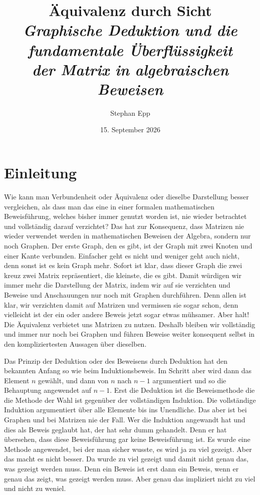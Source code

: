 \documentclass[12pt, a4paper]{article}
\title{\textbf{Äquivalenz durch Sicht}\\[0.5em]
  {\Large\itshape Graphische Deduktion und die fundamentale Überflüssigkeit\\ der Matrix in algebraischen Beweisen}}
\author{Stephan Epp}
\date{15. September 2026}
\theoremstyle{definition}
\theoremstyle{remark}
\begin{document}

\maketitle
\tableofcontents
\newpage

\section{Einleitung}
\label{sec:einleitung}

Wie kann man Verbundenheit oder Äquivalenz oder dieselbe Darstellung besser vergleichen, als dass man das eine in einer formalen mathematischen Beweisführung, welches bisher immer genutzt worden ist, nie wieder betrachtet und vollständig darauf verzichtet? Das hat zur Konsequenz, dass Matrizen nie wieder verwendet werden in mathematischen Beweisen der Algebra, sondern nur noch Graphen. Der erste Graph, den es gibt, ist der Graph mit zwei Knoten und einer Kante verbunden. Einfacher geht es nicht und weniger geht auch nicht, denn sonst ist es kein Graph mehr. Sofort ist klar, dass dieser Graph die zwei kreuz zwei Matrix repräsentiert, die kleinste, die es gibt. Damit würdigen wir immer mehr die Darstellung der Matrix, indem wir auf sie verzichten und Beweise und Anschauungen nur noch mit Graphen durchführen. Denn allen ist klar, wir verzichten damit auf Matrizen und vermissen sie sogar schon, denn vielleicht ist der ein oder andere Beweis jetzt sogar etwas mühsamer. Aber halt! Die Äquivalenz verbietet uns Matrizen zu nutzen. Deshalb bleiben wir vollständig und immer nur noch bei Graphen und führen Beweise weiter konsequent selbst in den kompliziertesten Aussagen über dieselben.

Das Prinzip der Deduktion oder des Beweisens durch Deduktion hat den bekannten Anfang so wie beim Induktionsbeweis. Im Schritt aber wird dann das Element $n$ gewählt, und dann von $n$ nach $n-1$ argumentiert und so die Behauptung angewendet auf $n-1$. Erst die Deduktion ist die Beweismethode die die Methode der Wahl ist gegenüber der vollständigen Induktion. Die vollständige Induktion argumentiert über alle Elemente bis ins Unendliche. Das aber ist bei Graphen und bei Matrizen nie der Fall. Wer die Induktion angewandt hat und dies als Beweis geglaubt hat, der hat sehr dumm gehandelt. Denn er hat übersehen, dass diese Beweisführung gar keine Beweisführung ist. Es wurde eine Methode angewendet, bei der man sicher wusste, es wird ja zu viel gezeigt. Aber das macht es nicht besser. Da wurde zu viel gezeigt und damit nicht genau das, was gezeigt werden muss. Denn ein Beweis ist erst dann ein Beweis, wenn er genau das zeigt, was gezeigt werden muss. Aber genau das impliziert nicht zu viel und nicht zu weniel.
\end{document}
